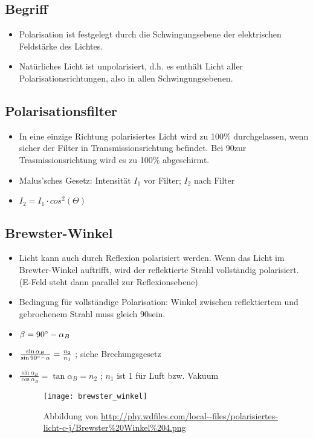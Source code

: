 \subsection{Begriff}
\begin{itemize}
\item Polarisation ist festgelegt durch die Schwingungsebene der elektrischen Feldstärke des Lichtes.
\item Natürliches Licht ist unpolarisiert, d.h. es enthält Licht aller Polarisationsrichtungen, also in allen Schwingungsebenen.
\end{itemize}

\subsection{Polarisationsfilter}
\begin{itemize}
\item In eine einzige Richtung polarisiertes Licht wird zu 100\% durchgelassen, wenn sicher der Filter in Transmissionsrichtung befindet. Bei 90\degree zur Trasmissionsrichtung wird es zu 100\% abgeschirmt.
\item Malus'sches Gesetz: Intensität $I_1$ vor Filter; $I_2$ nach Filter
\item $I_2 = I_1 \cdot cos^2(\Theta)$
\end{itemize}

\subsection{Brewster-Winkel}
\begin{itemize}
\item Licht kann auch durch Reflexion polarisiert werden. Wenn das Licht im Brewter-Winkel auftrifft, wird der reflektierte Strahl vollständig polarisiert.
(E-Feld steht dann parallel zur Reflexionsebene)
\item Bedingung für vollständige Polarisation: Winkel zwischen reflektiertem und gebrochenem Strahl muss gleich 90\degree sein.
\item $\beta = 90\degree - \alpha_B$
\item $\frac{\sin{\alpha_B}}{\sin{90\degree - \alpha}} = \frac{n_2}{n_1}$ \tabto{4cm}; siehe Brechungsgesetz
\item $\frac{\sin{\alpha_B}}{\cos{\alpha_B}} = \tan{\alpha_B} = n_2$ \tabto{4cm}; $n_1$ ist 1 für Luft bzw. Vakuum

\begin{figure}[h!]
\centering \texttt{[image: brewster\_winkel]}
\caption{Abbildung von \url{http://phy.wdfiles.com/local--files/polarisiertes-licht-c-j/Brewster\%20Winkel\%204.png}}
\end{figure}

\end{itemize}